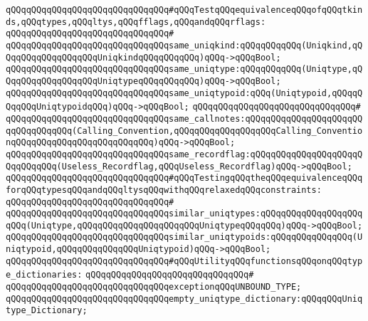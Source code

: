 \newline
\verb|qQQqqQQqqQQqqQQqqQQqqQQqqQQqqQQq#qQQqTestqQQqequivalenceqQQqofqQQqtkinds,qQQqtypes,qQQqltys,qQQqfflags,qQQqandqQQqrflags:|\newline
\verb|qQQqqQQqqQQqqQQqqQQqqQQqqQQqqQQq#|\newline
\verb|qQQqqQQqqQQqqQQqqQQqqQQqqQQqqQQqsame_uniqkind:qQQqqQQqqQQq(Uniqkind,qQQqqQQqqQQqqQQqqQQqUniqkindqQQqqQQqqQQq)qQQq->qQQqBool;|\newline
\verb|qQQqqQQqqQQqqQQqqQQqqQQqqQQqqQQqsame_uniqtype:qQQqqQQqqQQq(Uniqtype,qQQqqQQqqQQqqQQqqQQqUniqtypeqQQqqQQqqQQq)qQQq->qQQqBool;|\newline
\verb|qQQqqQQqqQQqqQQqqQQqqQQqqQQqqQQqsame_uniqtypoid:qQQq(Uniqtypoid,qQQqqQQqqQQqUniqtypoidqQQq)qQQq->qQQqBool;|\newline
\verb|qQQqqQQqqQQqqQQqqQQqqQQqqQQqqQQq#|\newline
\verb|qQQqqQQqqQQqqQQqqQQqqQQqqQQqqQQqsame_callnotes:qQQqqQQqqQQqqQQqqQQqqQQqqQQqqQQqqQQq(Calling_Convention,qQQqqQQqqQQqqQQqqQQqCalling_ConventionqQQqqQQqqQQqqQQqqQQqqQQqqQQq)qQQq->qQQqBool;|\newline
\verb|qQQqqQQqqQQqqQQqqQQqqQQqqQQqqQQqsame_recordflag:qQQqqQQqqQQqqQQqqQQqqQQqqQQqqQQq(Useless_Recordflag,qQQqUseless_Recordflag)qQQq->qQQqBool;|\newline
\newline
\verb|qQQqqQQqqQQqqQQqqQQqqQQqqQQqqQQq#qQQqTestingqQQqtheqQQqequivalenceqQQqforqQQqtypesqQQqandqQQqltysqQQqwithqQQqrelaxedqQQqconstraints:|\newline
\verb|qQQqqQQqqQQqqQQqqQQqqQQqqQQqqQQq#|\newline
\verb|qQQqqQQqqQQqqQQqqQQqqQQqqQQqqQQqsimilar_uniqtypes:qQQqqQQqqQQqqQQqqQQqqQQq(Uniqtype,qQQqqQQqqQQqqQQqqQQqqQQqUniqtypeqQQqqQQq)qQQq->qQQqBool;|\newline
\verb|qQQqqQQqqQQqqQQqqQQqqQQqqQQqqQQqsimilar_uniqtypoids:qQQqqQQqqQQqqQQq(Uniqtypoid,qQQqqQQqqQQqqQQqUniqtypoid)qQQq->qQQqBool;|\newline
\newline
\verb|qQQqqQQqqQQqqQQqqQQqqQQqqQQqqQQq#qQQqUtilityqQQqfunctionsqQQqonqQQqtype_dictionaries:|\newline
\verb|qQQqqQQqqQQqqQQqqQQqqQQqqQQqqQQq#|\newline
\verb|qQQqqQQqqQQqqQQqqQQqqQQqqQQqqQQqexceptionqQQqUNBOUND_TYPE;|\newline
\newline
\verb|qQQqqQQqqQQqqQQqqQQqqQQqqQQqqQQqempty_uniqtype_dictionary:qQQqqQQqUniqtype_Dictionary;|\newline
